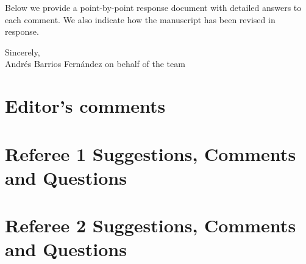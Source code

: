 \documentclass[11pt,english]{article}
\begin{document}
Below we provide a point-by-point response document with detailed answers to each comment. We also indicate how the manuscript has been revised in response.

\vspace{1em}

Sincerely,\\[0.5em]

Andr\'es Barrios Fern\'andez on behalf of the team
\clearpage 

\section*{Editor's comments}

\addtocounter{TotalComments}{\value{RefComment}}
\FloatBarrier


\newpage \setcounter{Ref}{1}\setcounter{RefComment}{0}
\setcounter{table}{0}
\setcounter{figure}{0}

\section*{Referee 1 Suggestions, Comments and Questions }

\addtocounter{TotalComments}{\value{RefComment}}
\FloatBarrier

\newpage \setcounter{Ref}{2} \setcounter{RefComment}{0}
\setcounter{table}{0}
\setcounter{figure}{0}
\section*{Referee 2 Suggestions, Comments and Questions }

\addtocounter{TotalComments}{\value{RefComment}}
\FloatBarrier


 
\end{document}
